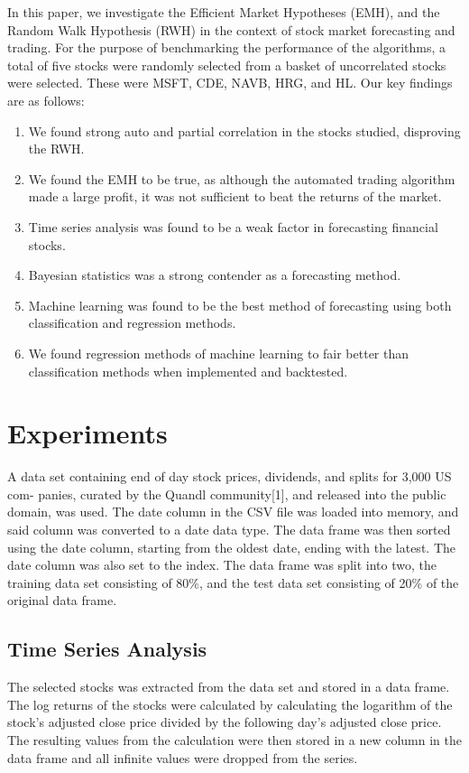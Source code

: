 \documentclass[times]{jtitauth}
\begin{document}
In this paper, we investigate the Efficient Market Hypotheses (EMH), and the Random Walk Hypothesis (RWH) in the context of stock market forecasting and trading. For the purpose of benchmarking the performance of the algorithms, a total of five stocks were randomly selected from a basket of uncorrelated stocks were selected. These were MSFT, CDE, NAVB, HRG, and HL. Our key findings are as follows:

\begin{enumerate}
  \item We found strong auto and partial correlation in the stocks studied, disproving the RWH.
  \item We found the EMH to be true, as although the automated trading algorithm made a large profit, it was not sufficient to beat the returns of the market.
  \item Time series analysis was found to be a weak factor in forecasting financial stocks.
  \item Bayesian statistics was a strong contender as a forecasting method.
  \item Machine learning was found to be the best method of forecasting using both classification and regression methods. 
  \item We found regression methods of machine learning to fair better than classification methods when implemented and backtested.
\end{enumerate}

\section{Experiments}
A data set containing end of day stock prices, dividends, and splits for 3,000 US com- panies, curated by the Quandl community[1], and released into the public domain, was used. The date column in the CSV file was loaded into memory, and said column was converted to a date data type. The data frame was then sorted using the date column, starting from the oldest date, ending with the latest. The date column was also set to the index. The data frame was split into two, the training data set consisting of 80\%, and the test data set consisting of 20\% of the original data frame.

\subsection{Time Series Analysis}
The selected stocks was extracted from the data set and stored in a data frame. The log returns of the stocks were calculated by calculating the logarithm of the stock's adjusted close price divided by the following day's adjusted close price. The resulting values from the calculation were then stored in a new column in the data frame and all infinite values were dropped from the series.
\end{document}
